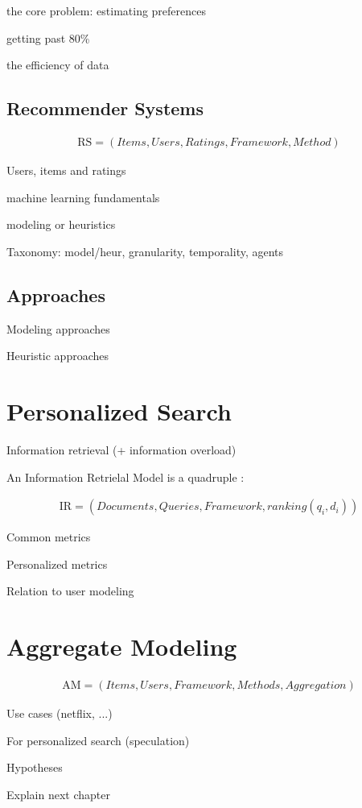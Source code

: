 the core problem: estimating preferences

getting past 80\%

the efficiency of data


\subsection{Recommender Systems}

\begin{eqnarray}
  \mathrm{RS} = (Items, Users, Ratings, Framework, Method)
\end{eqnarray}

Users, items and ratings

machine learning fundamentals

modeling or heuristics

Taxonomy: model/heur, granularity, temporality, agents

\subsection{Approaches}

Modeling approaches

Heuristic approaches


\section{Personalized Search}

Information retrieval (+ information overload)

An Information Retrielal Model is a quadruple \citep[p23]{Baeza-Yates1999}:

\begin{eqnarray}
  \mathrm{IR} = (Documents, Queries, Framework, ranking(q_i, d_i))
\end{eqnarray}

Common metrics

Personalized metrics

Relation to user modeling


\section{Aggregate Modeling}

\begin{eqnarray}
  \mathrm{AM} = (Items, Users, Framework, Methods, Aggregation)
\end{eqnarray}




Use cases (netflix, ...)

For personalized search (speculation)

Hypotheses

Explain next chapter


